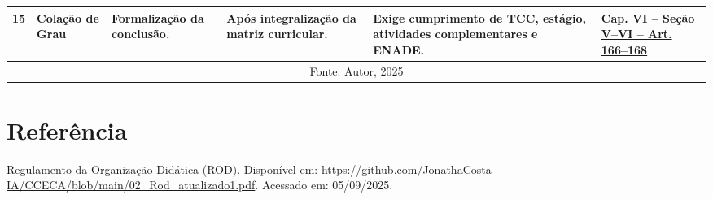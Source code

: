 \documentclass[authoryear]{elsarticle}
\begin{document}
\begin{longtable}{|c|p{3cm}|p{3cm}|p{3.5cm}|p{3.5cm}|p{2cm}|}
	\hline
	15 & Colação de Grau & Formalização da conclusão. & Após integralização da matriz curricular. & Exige cumprimento de TCC, estágio, atividades complementares e ENADE. & \href{https://github.com/JonathaCosta-IA/CCECA/blob/main/02_Rod_atualizado1.pdf}{Cap. VI – Seção V--VI – Art. 166--168} \\
	\hline
	\multicolumn{6}{|c|}{\scriptsize Fonte: Autor, 2025} \\
\end{longtable}

		
	\section*{Referência}
	Regulamento da Organização Didática (ROD). Disponível em: 
	\url{https://github.com/JonathaCosta-IA/CCECA/blob/main/02_Rod_atualizado1.pdf}. Acessado em: 05/09/2025.
	
\end{document}
